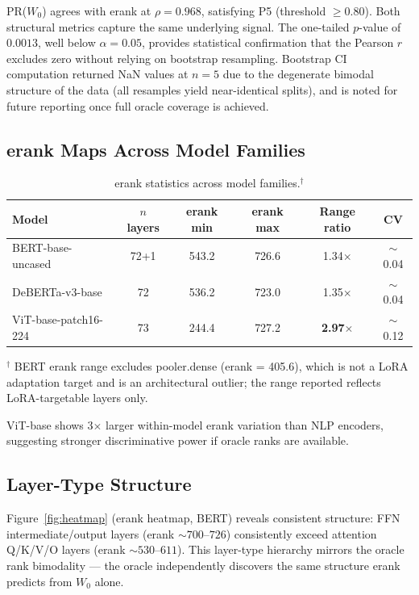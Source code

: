 PR($W_0$) agrees with erank at $\rho = 0.968$, satisfying P5 (threshold $\geq 0.80$). Both structural metrics capture the same underlying signal. The one-tailed $p$-value of $0.0013$, well below $\alpha = 0.05$, provides statistical confirmation that the Pearson $r$ excludes zero without relying on bootstrap resampling. Bootstrap CI computation returned NaN values at $n=5$ due to the degenerate bimodal structure of the data (all resamples yield near-identical splits), and is noted for future reporting once full oracle coverage is achieved.

\subsection{erank Maps Across Model Families}

\begin{table}[h]
\centering
\caption{erank statistics across model families.$^{\dagger}$}
\label{tab:erank_stats}
\begin{tabular}{lccccc}
\toprule
Model & $n$ layers & erank min & erank max & Range ratio & CV \\
\midrule
BERT-base-uncased & 72+1 & 543.2 & 726.6 & 1.34$\times$ & $\sim$0.04 \\
DeBERTa-v3-base & 72 & 536.2 & 723.0 & 1.35$\times$ & $\sim$0.04 \\
ViT-base-patch16-224 & 73 & 244.4 & 727.2 & \textbf{2.97$\times$} & $\sim$0.12 \\
\bottomrule
\end{tabular}
\end{table}

$^{\dagger}$ BERT erank range excludes pooler.dense (erank = 405.6), which is not a LoRA adaptation target and is an architectural outlier; the range reported reflects LoRA-targetable layers only.

ViT-base shows 3$\times$ larger within-model erank variation than NLP encoders, suggesting stronger discriminative power if oracle ranks are available.

\subsection{Layer-Type Structure}

Figure~\ref{fig:heatmap} (erank heatmap, BERT) reveals consistent structure: FFN intermediate/output layers (erank $\sim 700$--$726$) consistently exceed attention Q/K/V/O layers (erank $\sim 530$--$611$). This layer-type hierarchy mirrors the oracle rank bimodality --- the oracle independently discovers the same structure erank predicts from $W_0$ alone.
